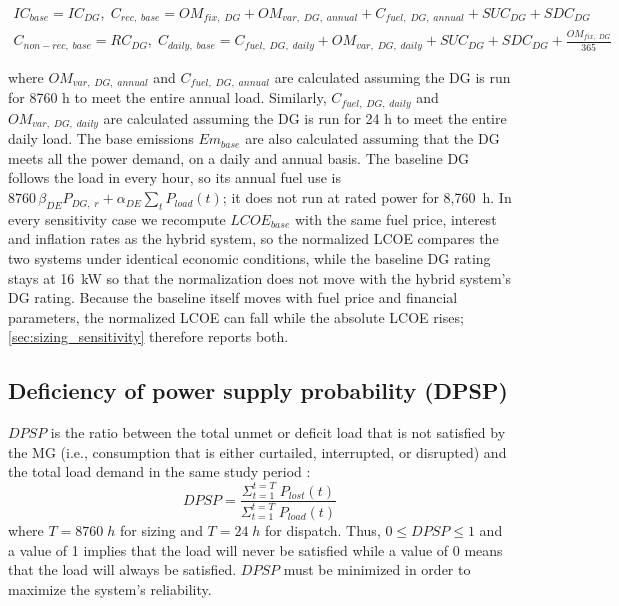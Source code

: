 \documentclass[final,3p,times]{elsarticle}
\begin{document}
\begin{gather*}
    IC_{base} = IC_{DG}, \; C_{rec,\; base} = OM_{fix,\;DG} + OM_{var, \; DG,\; annual} + C_{fuel,\; DG,\; annual} + SUC_{DG} + SDC_{DG}  \\
    C_{non-rec,\; base} = RC_{DG}, \; C_{daily,\; base} = C_{fuel,\; DG,\; daily} + OM_{var, \; DG,\; daily} + SUC_{DG} + SDC_{DG} + \frac{OM_{fix,\;DG}}{365}
\end{gather*}

\noindent where $OM_{var, \; DG,\; annual}$ and $C_{fuel,\; DG,\; annual}$ are calculated assuming the DG is run for 8760 h to meet the entire annual load. Similarly, $C_{fuel,\; DG,\; daily}$ and $OM_{var, \; DG,\; daily}$ are calculated assuming the DG is run for 24 h to meet the entire daily load. The base emissions $Em_{base}$ are also calculated assuming that the DG meets all the power demand, on a daily and annual basis. The baseline DG follows the load in every hour, so its annual fuel use is $8760\,\beta_{DE} P_{DG,\;r} + \alpha_{DE} \sum_t P_{load}(t)$; it does not run at rated power for 8,760~h. In every sensitivity case we recompute $LCOE_{base}$ with the same fuel price, interest and inflation rates as the hybrid system, so the normalized LCOE compares the two systems under identical economic conditions, while the baseline DG rating stays at 16~kW so that the normalization does not move with the hybrid system's DG rating. Because the baseline itself moves with fuel price and financial parameters, the normalized LCOE can fall while the absolute LCOE rises; \cref{sec:sizing_sensitivity} therefore reports both.

\subsection{Deficiency of power supply probability (DPSP)}
$DPSP$ is the ratio between the total unmet or deficit load that is not satisfied by the MG (i.e., consumption that is either curtailed, interrupted, or disrupted) and the total load demand in the same study period \cite{prasad2006}:
\begin{equation}
    DPSP = \frac{\Sigma_{t=1}^{t=T} \; P_{lost}(t)}{\Sigma_{t=1}^{t=T} \; P_{load}(t)}
\end{equation}
where $T = 8760\;h$ for sizing and $T = 24\;h$ for dispatch. Thus, $0 \leq DPSP \leq 1$ and a value of 1 implies that the load will never be satisfied while a value of 0 means that the load will always be satisfied. $DPSP$ must be minimized in order to maximize the system's reliability.  
\end{document}
